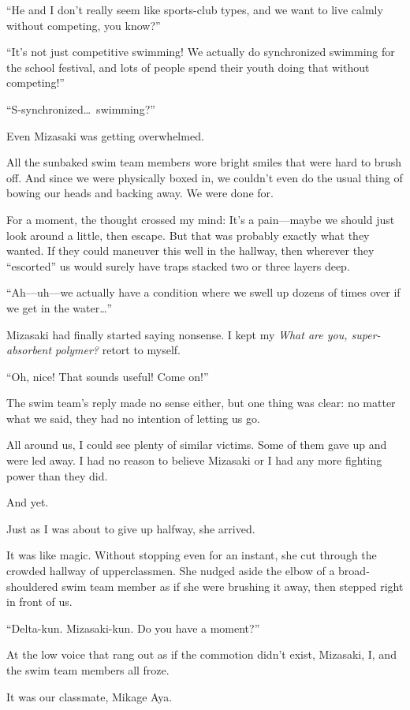 \documentclass[
    a4paper,
    12pt,
    twoside,
    openany,
    UTF8,
    fontset=windows
]{ctexbook}
\begin{document}
``He and I don't really seem like sports-club types, and we want to live calmly without competing, you know?''

``It's not just competitive swimming! We actually do synchronized swimming for the school festival, and lots of people spend their youth doing that without competing!''

``S-synchronized\dots\ swimming?''

Even Mizasaki was getting overwhelmed.

All the sunbaked swim team members wore bright smiles that were hard to brush off. And since we were physically boxed in, we couldn't even do the usual thing of bowing our heads and backing away. We were done for.

For a moment, the thought crossed my mind: It's a pain---maybe we should just look around a little, then escape. But that was probably exactly what they wanted. If they could maneuver this well in the hallway, then wherever they ``escorted'' us would surely have traps stacked two or three layers deep.

``Ah---uh---we actually have a condition where we swell up dozens of times over if we get in the water\dots''

Mizasaki had finally started saying nonsense. I kept my \textit{What are you, super-absorbent polymer?} retort to myself.

``Oh, nice! That sounds useful! Come on!''

The swim team's reply made no sense either, but one thing was clear: no matter what we said, they had no intention of letting us go.

All around us, I could see plenty of similar victims. Some of them gave up and were led away. I had no reason to believe Mizasaki or I had any more fighting power than they did.

And yet.

Just as I was about to give up halfway, she arrived.

It was like magic. Without stopping even for an instant, she cut through the crowded hallway of upperclassmen. She nudged aside the elbow of a broad-shouldered swim team member as if she were brushing it away, then stepped right in front of us.

``Delta-kun. Mizasaki-kun. Do you have a moment?''

At the low voice that rang out as if the commotion didn't exist, Mizasaki, I, and the swim team members all froze.

It was our classmate, Mikage Aya.
\end{document}
